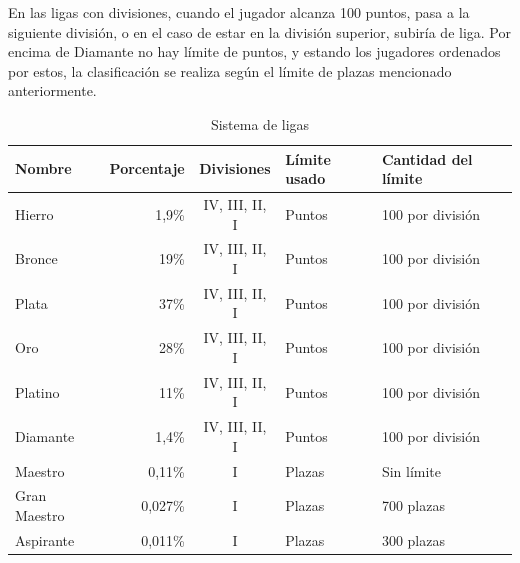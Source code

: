En las ligas con divisiones, cuando el jugador alcanza 100 puntos,  pasa a la siguiente división, o en el caso de estar en la división superior, subiría de liga. Por encima de Diamante no hay límite de puntos, y estando los jugadores ordenados por estos, la clasificación se realiza según el límite de plazas mencionado anteriormente.

\begin{table}[h]
	\renewcommand{\arraystretch}{1.2}
	\begin{tabular}{lrcll}\toprule
		\textbf{Nombre} & \textbf{Porcentaje} & \textbf{Divisiones} & \textbf{Límite usado} & \textbf{Cantidad del límite} \\ \midrule
		Hierro & 1,9\% & IV, III, II, I & Puntos  & 100 por división \\
		Bronce & 19\% & IV, III, II, I & Puntos  & 100 por división \\
		Plata & 37\% & IV, III, II, I & Puntos  & 100 por división \\
		Oro & 28\% & IV, III, II, I & Puntos  & 100 por división \\
		Platino & 11\% & IV, III, II, I & Puntos  & 100 por división \\
		Diamante & 1,4\% & IV, III, II, I & Puntos  & 100 por división \\
		Maestro & 0,11\% & I & Plazas  & Sin límite \\
		Gran Maestro & 0,027\% & I & Plazas  & 700 plazas \\
		Aspirante & 0,011\% & I & Plazas  & 300 plazas \\ \bottomrule
	\end{tabular}
	\caption{Sistema de ligas}
	\label{tab:ligas}
\end{table}


